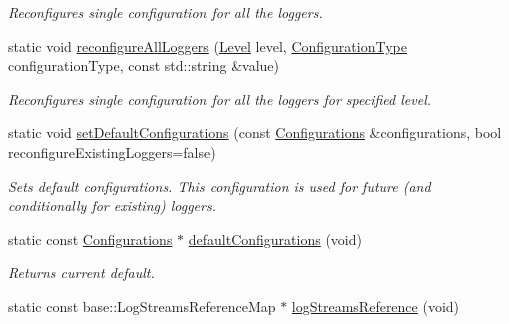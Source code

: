 \begin{DoxyCompactItemize}
\begin{DoxyCompactList}\small\item\em Reconfigures single configuration for all the loggers. \end{DoxyCompactList}\item 
static void \hyperlink{classel_1_1Loggers_ab24b99e5bb3c907d1418ee3266f15397}{reconfigure\+All\+Loggers} (\hyperlink{namespaceel_ab0ac6091262344c52dd2d3ad099e8e36}{Level} level, \hyperlink{namespaceel_a281f5db6d6163678bc68a8b23b59e124}{Configuration\+Type} configuration\+Type, const std\+::string \&value)\hypertarget{classel_1_1Loggers_ab24b99e5bb3c907d1418ee3266f15397}{}\label{classel_1_1Loggers_ab24b99e5bb3c907d1418ee3266f15397}

\begin{DoxyCompactList}\small\item\em Reconfigures single configuration for all the loggers for specified level. \end{DoxyCompactList}\item 
static void \hyperlink{classel_1_1Loggers_ab9fb62a8ff904ff887fefde3282f46a4}{set\+Default\+Configurations} (const \hyperlink{classel_1_1Configurations}{Configurations} \&configurations, bool reconfigure\+Existing\+Loggers=false)\hypertarget{classel_1_1Loggers_ab9fb62a8ff904ff887fefde3282f46a4}{}\label{classel_1_1Loggers_ab9fb62a8ff904ff887fefde3282f46a4}

\begin{DoxyCompactList}\small\item\em Sets default configurations. This configuration is used for future (and conditionally for existing) loggers. \end{DoxyCompactList}\item 
static const \hyperlink{classel_1_1Configurations}{Configurations} $\ast$ \hyperlink{classel_1_1Loggers_a96f2336fafdc3ef2c4df01a73ae5ffb7}{default\+Configurations} (void)\hypertarget{classel_1_1Loggers_a96f2336fafdc3ef2c4df01a73ae5ffb7}{}\label{classel_1_1Loggers_a96f2336fafdc3ef2c4df01a73ae5ffb7}

\begin{DoxyCompactList}\small\item\em Returns current default. \end{DoxyCompactList}\item 
static const base\+::\+Log\+Streams\+Reference\+Map $\ast$ \hyperlink{classel_1_1Loggers_ad17312c9474d94bc98efcaf08ca279a4}{log\+Streams\+Reference} (void)\hypertarget{classel_1_1Loggers_ad17312c9474d94bc98efcaf08ca279a4}{}\label{classel_1_1Loggers_ad17312c9474d94bc98efcaf08ca279a4}


\end{DoxyCompactItemize}
